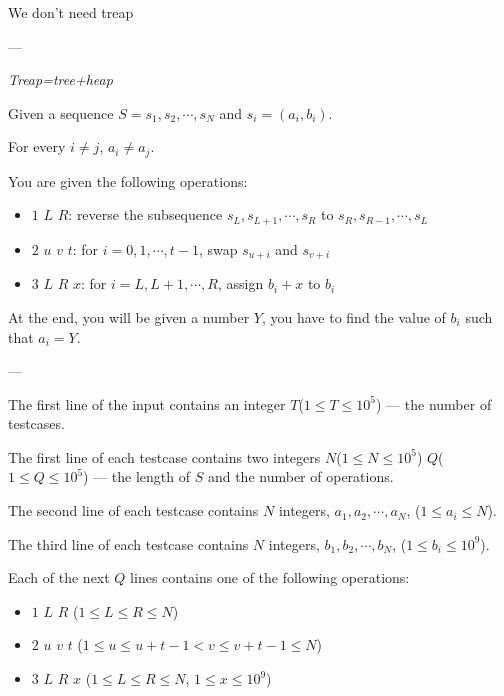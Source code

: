 
We don't need treap

---


\begin{center}
    \textit{Treap=tree+heap}
    \end{center}
    
    Given a sequence $S = s_1, s_2, \cdots, s_N$ and $s_i = (a_i, b_i)$.
    
    For every $i\neq j$, $a_i\neq a_j$.
    
    You are given the following operations:
    \begin{itemize}
        \item $1$ $L$ $R$: reverse the subsequence $s_L, s_{L+1}, \cdots, s_{R}$ to $s_{R}, s_{R-1}, \cdots, s_L$
        \item $2$ $u$ $v$ $t$: for $i = 0, 1, \cdots, t-1$, swap $s_{u+i}$ and $s_{v+i}$
        \item $3$ $L$ $R$ $x$: for $i = L, L+1, \cdots, R$, assign $b_i + x$ to $b_i$
    \end{itemize}
    
    At the end, you will be given a number $Y$, you have to find the value of $b_i$ such that $a_i = Y$.

---


The first line of the input contains an integer $T$($1\leq T\leq 10^5$) --- the number of testcases.

The first line of each testcase contains two integers $N$($1\leq N\leq 10^5$) $Q$($1\leq Q\leq 10^5$) --- the length of $S$ and the number of operations.

The second line of each testcase contains $N$ integers, $a_1, a_2, \cdots, a_N$, ($1\leq a_i\leq N$).

The third line of each testcase contains $N$ integers, $b_1, b_2, \cdots, b_N$, ($1\leq b_i\leq 10^9$).

Each of the next $Q$ lines contains one of the following operations:
\begin{itemize}
    \item $1$ $L$ $R$ ($1\leq L \leq R \leq N$)
    \item $2$ $u$ $v$ $t$ ($1\leq u\leq u+t-1 < v\leq v+t-1\leq N$)
    \item $3$ $L$ $R$ $x$ ($1\leq L \leq R \leq N$, $1\leq x\leq 10^9$)
\end{itemize}

